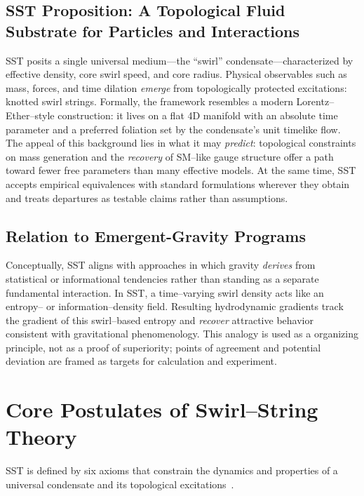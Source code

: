 \documentclass[10pt,reprint,aps,onecolumn,nofootinbib]{revtex4-2}
\begin{document}
    \subsection*{SST Proposition: A Topological Fluid Substrate for Particles and Interactions}
        SST posits a single universal medium—the “swirl” condensate—characterized by effective density, core swirl speed, and core radius. Physical observables such as mass, forces, and time dilation \emph{emerge} from topologically protected excitations: knotted swirl strings. Formally, the framework resembles a modern Lorentz–Ether–style construction: it lives on a flat 4D manifold with an absolute time parameter and a preferred foliation set by the condensate’s unit timelike flow. The appeal of this background lies in what it may \emph{predict}: topological constraints on mass generation and the \emph{recovery} of SM–like gauge structure offer a path toward fewer free parameters than many effective models. At the same time, SST accepts empirical equivalences with standard formulations wherever they obtain and treats departures as testable claims rather than assumptions.

    \subsection*{Relation to Emergent-Gravity Programs}
        Conceptually, SST aligns with approaches in which gravity \emph{derives} from statistical or informational tendencies rather than standing as a separate fundamental interaction. In SST, a time–varying swirl density acts like an entropy– or information–density field. Resulting hydrodynamic gradients track the gradient of this swirl–based entropy and \emph{recover} attractive behavior consistent with gravitational phenomenology. This analogy is used as a organizing principle, not as a proof of superiority; points of agreement and potential deviation are framed as targets for calculation and experiment.

\section{Core Postulates of Swirl–String Theory}
    \label{sec:postulates}
    SST is defined by six axioms that constrain the dynamics and properties of a universal condensate and its topological excitations~\cite{1}.
\end{document}
